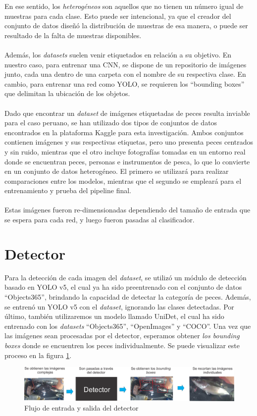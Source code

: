 En ese sentido, los \textit{heterogéneos} son aquellos que no tienen un 
número igual de muestras para cada clase. Esto puede ser intencional, ya que el 
creador del conjunto de datos diseñó la distribución de muestras de esa manera, o 
puede ser resultado de la falta de muestras disponibles.
\\\\
Además, los \textit{datasets} suelen venir etiquetados en relación a su objetivo. 
En nuestro caso, para entrenar una CNN, se dispone de un repositorio de imágenes 
junto, cada una dentro de una carpeta con el nombre de su respectiva clase. En 
cambio, para entrenar una red como YOLO, se requieren los ``bounding boxes'' que 
delimitan la ubicación de los objetos.
\\\\
Dado que encontrar un \textit{dataset} de imágenes etiquetadas de peces resulta 
inviable para el caso peruano, se han utilizado dos tipos de conjuntos de datos 
encontrados en la plataforma Kaggle para esta investigación. Ambos conjuntos contienen 
imágenes y sus respectivas etiquetas, pero uno presenta peces centrados y sin ruido, 
mientras que el otro incluye fotografías tomadas en un entorno real donde se encuentran 
peces, personas e instrumentos de pesca, lo que lo convierte en un conjunto de datos 
heterogéneo. El primero se utilizará para realizar comparaciones entre los modelos, 
mientras que el segundo se empleará para el entrenamiento y prueba del pipeline final.
\\\\
Estas imágenes fueron re-dimensionadas dependiendo del tamaño de entrada que se espera 
para cada red, y luego fueron pasadas al clasificador.

\section{Detector}
Para la detección de cada imagen del \textit{dataset}, se utilizó un módulo de detección 
basado en YOLO v5, el cual ya ha sido preentrenado con el conjunto de datos ``Objects365'', 
brindando la capacidad de detectar la categoría de peces. Además, se entrenó un YOLO v5 con 
el \textit{dataset}, ignorando las clases detectadas. Por último, también utilizaremos un 
modelo llamado UniDet, el cual ha sido entrenado con los \textit{datasets} ``Objects365'', 
``OpenImages'' y ``COCO''.  Una vez que las imágenes sean procesadas por el detector, 
esperamos obtener \textit{los bounding boxes} donde se encuentren los peces individualmente. 
Se puede visualizar este proceso en la figura \ref{fig:detector_pez}.
\begin{figure}[h!]
\includegraphics[width=1\textwidth]{images/detector_pez.png}
\caption{Flujo de entrada y salida del detector }
\label{fig:detector_pez}
\end{figure}



